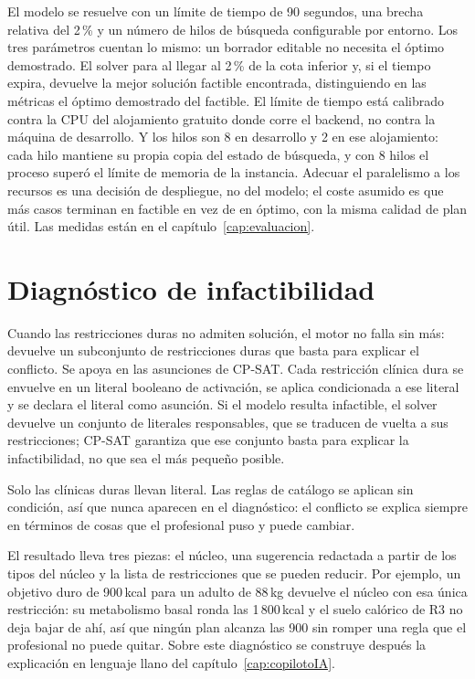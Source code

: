 El modelo se resuelve con un límite de tiempo de 90 segundos, una brecha relativa del 2\,\% y un número de hilos de búsqueda configurable por entorno. Los tres parámetros cuentan lo mismo: un borrador editable no necesita el óptimo demostrado. El solver para al llegar al 2\,\% de la cota inferior y, si el tiempo expira, devuelve la mejor solución factible encontrada, distinguiendo en las métricas el óptimo demostrado del factible. El límite de tiempo está calibrado contra la CPU del alojamiento gratuito donde corre el backend, no contra la máquina de desarrollo. Y los hilos son 8 en desarrollo y 2 en ese alojamiento: cada hilo mantiene su propia copia del estado de búsqueda, y con 8 hilos el proceso superó el límite de memoria de la instancia. Adecuar el paralelismo a los recursos es una decisión de despliegue, no del modelo; el coste asumido es que más casos terminan en factible en vez de en óptimo, con la misma calidad de plan útil. Las medidas están en el capítulo~\ref{cap:evaluacion}.

\section{Diagnóstico de infactibilidad}
\label{sec:infactibilidad}

Cuando las restricciones duras no admiten solución, el motor no falla sin más: devuelve un subconjunto de restricciones duras que basta para explicar el conflicto. Se apoya en las asunciones de CP-SAT. Cada restricción clínica dura se envuelve en un literal booleano de activación, se aplica condicionada a ese literal y se declara el literal como asunción. Si el modelo resulta infactible, el solver devuelve un conjunto de literales responsables, que se traducen de vuelta a sus restricciones; CP-SAT garantiza que ese conjunto basta para explicar la infactibilidad, no que sea el más pequeño posible.

Solo las clínicas duras llevan literal. Las reglas de catálogo se aplican sin condición, así que nunca aparecen en el diagnóstico: el conflicto se explica siempre en términos de cosas que el profesional puso y puede cambiar.

El resultado lleva tres piezas: el núcleo, una sugerencia redactada a partir de los tipos del núcleo y la lista de restricciones que se pueden reducir. Por ejemplo, un objetivo duro de 900\,kcal para un adulto de 88\,kg devuelve el núcleo con esa única restricción: su metabolismo basal ronda las 1\,800\,kcal y el suelo calórico de R3 no deja bajar de ahí, así que ningún plan alcanza las 900 sin romper una regla que el profesional no puede quitar. Sobre este diagnóstico se construye después la explicación en lenguaje llano del capítulo~\ref{cap:copilotoIA}.

